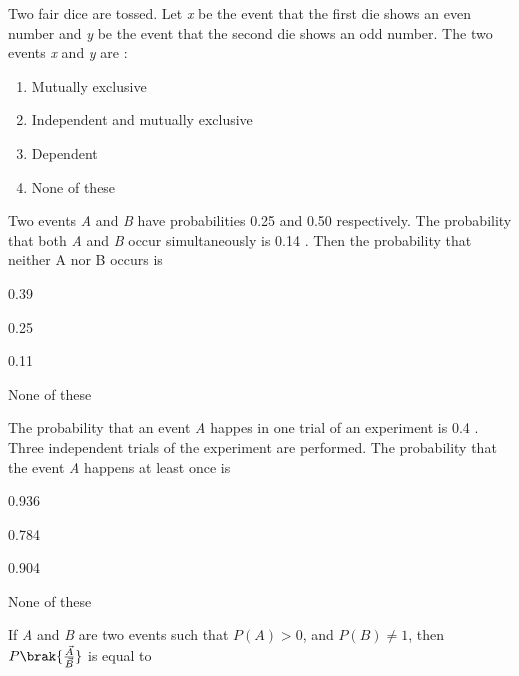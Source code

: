 \iffalse

\title{ASSIGNMENT2 - PROBABILITY}
\author{EE24BTECH11012 - Bhavanisankar G S}
\fi 
	\item Two fair dice are tossed. Let \emph{x} be the event that the first die shows an even number and \emph{y} be the event that the second die shows an odd number. The two events \emph{x} and \emph{y} are : \hfill{}
  \begin{enumerate}
\item Mutually exclusive \item Independent and mutually exclusive  \item Dependent   \item None of these
\end{enumerate}
\item Two events \emph{A} and \emph{B} have probabilities 0.25 and 0.50 respectively. The probability that both \emph{A} and \emph{B} occur simultaneously is 0.14 . Then the probability that neither A nor B occurs is \hfill{}
\begin{enumerate}
\begin{multicols}{2}
\item 0.39  \item 0.25  \item 0.11  \item None of these
\end{multicols}
\end{enumerate}
\item The probability that an event \emph{A} happes in one trial of an experiment is 0.4 . Three independent trials of the experiment are performed. The probability that the event \emph{A} happens at least once is \hfill{}
\begin{enumerate}
\begin{multicols}{2}
\item 0.936  \item 0.784  \item 0.904  \item None of these
\end{multicols}
\end{enumerate}
\item If \emph{A} and \emph{B} are two events such that $ P(A) >0 $, and $ P(B) \neq1 $, then $ P \brak{\frac{\vec{A}}{\vec{B}}}$ is equal to \hfill{}

